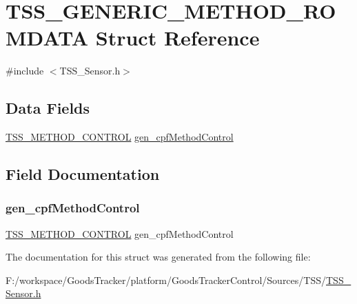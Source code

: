 \hypertarget{struct_t_s_s___g_e_n_e_r_i_c___m_e_t_h_o_d___r_o_m_d_a_t_a}{}\section{T\+S\+S\+\_\+\+G\+E\+N\+E\+R\+I\+C\+\_\+\+M\+E\+T\+H\+O\+D\+\_\+\+R\+O\+M\+D\+A\+TA Struct Reference}
\label{struct_t_s_s___g_e_n_e_r_i_c___m_e_t_h_o_d___r_o_m_d_a_t_a}


{\ttfamily \#include $<$T\+S\+S\+\_\+\+Sensor.\+h$>$}

\subsection*{Data Fields}
\begin{DoxyCompactItemize}
\item 
\hyperlink{_t_s_s___sensor_8h_a667459bda737776d6639765a4e4a4ad3}{T\+S\+S\+\_\+\+M\+E\+T\+H\+O\+D\+\_\+\+C\+O\+N\+T\+R\+OL} \hyperlink{struct_t_s_s___g_e_n_e_r_i_c___m_e_t_h_o_d___r_o_m_d_a_t_a_a599b7af2a92d018a6e62533b6d1f297d}{gen\+\_\+cpf\+Method\+Control}
\end{DoxyCompactItemize}


\subsection{Field Documentation}
\mbox{\label{struct_t_s_s___g_e_n_e_r_i_c___m_e_t_h_o_d___r_o_m_d_a_t_a_a599b7af2a92d018a6e62533b6d1f297d}} 
\subsubsection{\texorpdfstring{gen\+\_\+cpf\+Method\+Control}{gen\_cpfMethodControl}}
{\footnotesize\ttfamily \hyperlink{_t_s_s___sensor_8h_a667459bda737776d6639765a4e4a4ad3}{T\+S\+S\+\_\+\+M\+E\+T\+H\+O\+D\+\_\+\+C\+O\+N\+T\+R\+OL} gen\+\_\+cpf\+Method\+Control}



The documentation for this struct was generated from the following file\+:\begin{DoxyCompactItemize}
\item 
F\+:/workspace/\+Goods\+Tracker/platform/\+Goods\+Tracker\+Control/\+Sources/\+T\+S\+S/\hyperlink{_t_s_s___sensor_8h}{T\+S\+S\+\_\+\+Sensor.\+h}\end{DoxyCompactItemize}
